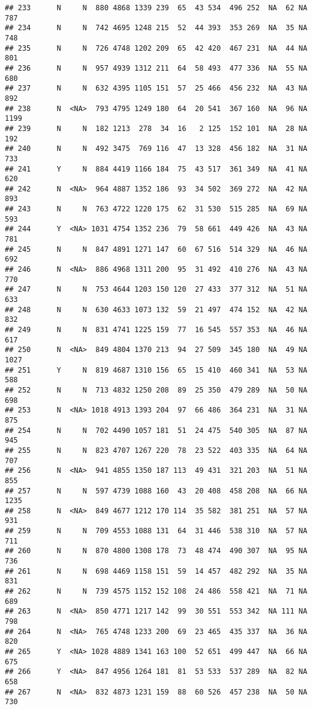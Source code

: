 \documentclass[]{article}
\begin{document}
\begin{verbatim}
## 233      N     N  880 4868 1339 239  65  43 534  496 252  NA  62 NA  787
## 234      N     N  742 4695 1248 215  52  44 393  353 269  NA  35 NA  748
## 235      N     N  726 4748 1202 209  65  42 420  467 231  NA  44 NA  801
## 236      N     N  957 4939 1312 211  64  58 493  477 336  NA  55 NA  680
## 237      N     N  632 4395 1105 151  57  25 466  456 232  NA  43 NA  892
## 238      N  <NA>  793 4795 1249 180  64  20 541  367 160  NA  96 NA 1199
## 239      N     N  182 1213  278  34  16   2 125  152 101  NA  28 NA  192
## 240      N     N  492 3475  769 116  47  13 328  456 182  NA  31 NA  733
## 241      Y     N  884 4419 1166 184  75  43 517  361 349  NA  41 NA  620
## 242      N  <NA>  964 4887 1352 186  93  34 502  369 272  NA  42 NA  893
## 243      N     N  763 4722 1220 175  62  31 530  515 285  NA  69 NA  593
## 244      Y  <NA> 1031 4754 1352 236  79  58 661  449 426  NA  43 NA  781
## 245      N     N  847 4891 1271 147  60  67 516  514 329  NA  46 NA  692
## 246      N  <NA>  886 4968 1311 200  95  31 492  410 276  NA  43 NA  770
## 247      N     N  753 4644 1203 150 120  27 433  377 312  NA  51 NA  633
## 248      N     N  630 4633 1073 132  59  21 497  474 152  NA  42 NA  832
## 249      N     N  831 4741 1225 159  77  16 545  557 353  NA  46 NA  617
## 250      N  <NA>  849 4804 1370 213  94  27 509  345 180  NA  49 NA 1027
## 251      Y     N  819 4687 1310 156  65  15 410  460 341  NA  53 NA  588
## 252      N     N  713 4832 1250 208  89  25 350  479 289  NA  50 NA  698
## 253      N  <NA> 1018 4913 1393 204  97  66 486  364 231  NA  31 NA  875
## 254      N     N  702 4490 1057 181  51  24 475  540 305  NA  87 NA  945
## 255      N     N  823 4707 1267 220  78  23 522  403 335  NA  64 NA  707
## 256      N  <NA>  941 4855 1350 187 113  49 431  321 203  NA  51 NA  855
## 257      N     N  597 4739 1088 160  43  20 408  458 208  NA  66 NA 1235
## 258      N  <NA>  849 4677 1212 170 114  35 582  381 251  NA  57 NA  931
## 259      N     N  709 4553 1088 131  64  31 446  538 310  NA  57 NA  711
## 260      N     N  870 4800 1308 178  73  48 474  490 307  NA  95 NA  736
## 261      N     N  698 4469 1158 151  59  14 457  482 292  NA  35 NA  831
## 262      N     N  739 4575 1152 152 108  24 486  558 421  NA  71 NA  689
## 263      N  <NA>  850 4771 1217 142  99  30 551  553 342  NA 111 NA  798
## 264      N  <NA>  765 4748 1233 200  69  23 465  435 337  NA  36 NA  820
## 265      Y  <NA> 1028 4889 1341 163 100  52 651  499 447  NA  66 NA  675
## 266      Y  <NA>  847 4956 1264 181  81  53 533  537 289  NA  82 NA  658
## 267      N  <NA>  832 4873 1231 159  88  60 526  457 238  NA  50 NA  730

\end{verbatim}
\end{document}
